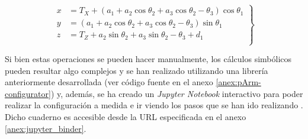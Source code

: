 \begin{equation}
    \label{eq:from_thetas_to_xyz}
    \left.\begin{aligned}
        x & = T_{X} + \left(a_{1} + a_2 \cos{\theta_{2}} + a_{3} \cos{\theta_{2} - \theta_{3}}\right) \cos{\theta_{1}} \\
        y & = \left(a_1 + a_{2} \cos{\theta_{2}} + a_{3} \cos{\theta_{2} - \theta_{3}}\right) \sin{\theta_{1}}         \\
        z & = T_{Z} + a_{2} \sin{\theta_{2}} + a_{3} \sin{\theta_{2} - \theta_{3}} + d_1                               \\
    \end{aligned}
    \right\}
\end{equation}

Si bien estas operaciones se pueden hacer manualmente, los cálculos simbólicos pueden
resultar algo complejos y se han realizado utilizando una librería anteriormente
desarrollada \cite{javieralonsosilvaUPMRoboticsUarm2019}
(ver código fuente en el anexo \ref{anex:pArm-configurator}) y, además, se ha creado
un \textit{Jupyter Notebook} interactivo para poder realizar la configuración a medida
e ir viendo los pasos que se han ido realizando \cite{javinator9889PArmTFGPArmconfigurator2020}.
Dicho cuaderno es accesible desde la URL especificada en el anexo \ref{anex:jupyter_binder}.
